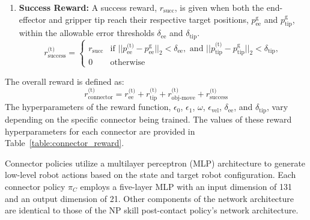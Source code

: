 \begin{itemize}
\begin{enumerate}
        \item \textbf{Success Reward:} A success reward, \( r_{\text{succ}} \), is given when both the end-effector and gripper tip reach their respective target positions, \( p^\text{g}_\text{ee} \) and \( p^\text{g}_\text{tip} \), within the allowable error thresholds \( \delta_\text{ee} \) and \( \delta_\text{tip} \).
    \[
    r^\text{(t)}_{\text{success}} =
    \begin{cases} 
    r_{\text{succ}} & \text{if } ||p^\text{(t)}_\text{ee} - p^\text{g}_\text{ee}||_2 < \delta_\text{ee}, \text{ and }  ||p^\text{(t)}_\text{tip} - p^\text{g}_\text{tip}||_2 < \delta_\text{tip}, \\
    0 & \text{otherwise}
    \end{cases}
    \]
    \end{enumerate}

    The overall reward is defined as:
    \[
    r^\text{(t)}_{\text{connector}} = r^\text{(t)}_{\text{ee}} + r^\text{(t)}_{\text{tip}} + r^\text{(t)}_{\text{obj-move}} + r^\text{(t)}_{\text{success}}
    \]
    The hyperparameters of the reward function, $\epsilon_0$, $\epsilon_1$, $\omega$, $\epsilon_\text{vel}$, $\delta_\text{ee}$, and $\delta_\text{tip}$, vary depending on the specific connector being trained. The values of these reward hyperparameters for each connector are provided in Table~\ref{table:connector_reward}.
    
\end{itemize}



Connector policies utilize a multilayer perceptron (MLP) architecture to generate low-level robot actions based on the state and target robot configuration. Each connector policy \( \pi_C \) employs a five-layer MLP with an input dimension of 131 and an output dimension of 21. Other components of the network architecture are identical to those of the NP skill post-contact policy's network architecture.
